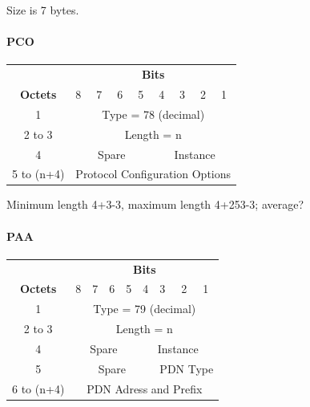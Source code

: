 Size is 7 bytes.

\paragraph{PCO}

\begin{center}
\begin{tabular}{c|p{1cm}|p{1cm}|p{1cm}|p{1cm}|p{1cm}|p{1cm}|p{1cm}|p{1cm}|}
\multicolumn{1}{c}{} & \multicolumn{8}{c}{\textbf{Bits}} \\
\cline{2-9} \textbf{Octets} & 8 & 7 & 6 & 5 & 4 & 3 & 2 & 1 \\ 
\cline{2-9} 1 & \multicolumn{8}{c|}{Type = 78 (decimal)} \\ 
\cline{2-9} 2 to 3 & \multicolumn{8}{c|}{Length = n}  \\ 
\cline{2-9} 4 & \multicolumn{4}{c|}{Spare} & \multicolumn{4}{c|}{Instance} \\ 
\cline{2-9} 5 to (n+4) & \multicolumn{8}{c|}{Protocol Configuration Options} \\
\cline{2-9}
\end{tabular}
\end{center}

Minimum length 4+3-3, maximum length 4+253-3; average?


\paragraph{PAA}

\begin{center}
\begin{tabular}{c|p{1cm}|p{1cm}|p{1cm}|p{1cm}|p{1cm}|p{1cm}|p{1cm}|p{1cm}|}
\multicolumn{1}{c}{} & \multicolumn{8}{c}{\textbf{Bits}} \\
\cline{2-9} \textbf{Octets} & 8 & 7 & 6 & 5 & 4 & 3 & 2 & 1 \\ 
\cline{2-9} 1 & \multicolumn{8}{c|}{Type = 79 (decimal)} \\ 
\cline{2-9} 2 to 3 & \multicolumn{8}{c|}{Length = n}  \\ 
\cline{2-9} 4 & \multicolumn{4}{c|}{Spare} & \multicolumn{4}{c|}{Instance} \\ 
\cline{2-9} 5 & \multicolumn{5}{c|}{Spare} & \multicolumn{3}{c|}{PDN Type} \\
\cline{2-9} 6 to (n+4) & \multicolumn{8}{c|}{PDN Adress and Prefix} \\
\cline{2-9}
\end{tabular} 
\end{center}


